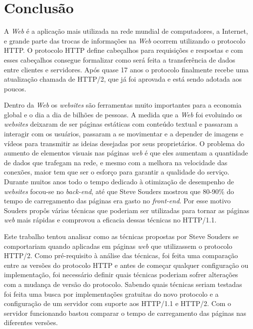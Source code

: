 %
%

\chapter{Conclusão}

A \textit{Web} é a aplicação mais utilizada na rede mundial de computadores, a Internet, e grande parte das trocas de informações na \textit{Web} ocorrem utilizando o protocolo HTTP. O protocolo HTTP define cabeçalhos para requisições e respostas e com esses cabeçalhos consegue formalizar como será feita a transferência de dados entre clientes e servidores. Após quase 17 anos o protocolo finalmente recebe uma atualização chamada de HTTP/2, que já foi aprovada e está sendo adotada aos poucos.

Dentro da \textit{Web} os \textit{websites} são ferramentas muito importantes para a economia global e o dia a dia de bilhões de pessoas. A medida que a \textit{Web} foi evoluindo os \textit{websites} deixaram de ser páginas estáticas com conteúdo textual e passaram a interagir com os usuários, passaram a se movimentar e a depender de imagens e vídeos para transmitir as ideias desejadas por seus proprietários. O problema do aumento de elementos visuais nas páginas \textit{web} é que eles aumentam a quantidade de dados que trafegam na rede, e mesmo com a melhora na velocidade das conexões, maior tem que ser o esforço para garantir a qualidade do serviço. Durante muitos anos todo o tempo dedicado à otimização de desempenho de \textit{websites} focou-se no \textit{back-end}, até que Steve Souders mostrou que 80-90\% do tempo de carregamento das páginas era gasto no \textit{front-end}. Por esse motivo Souders propôs várias técnicas que poderiam ser utilizadas para tornar as páginas \textit{web} mais rápidas e comprovou a eficacia dessas técnicas no HTTP/1.1.

Este trabalho tentou analisar como as técnicas propostas por Steve Souders se comportariam quando aplicadas em páginas \textit{web} que utilizassem o protocolo HTTP/2. Como pré-requisito à análise das técnicas, foi feita uma comparação entre as versões do protocolo HTTP e antes de começar qualquer configuração ou implementação, foi necessário definir quais técnicas poderiam sofrer alterações com a mudança de versão do protocolo. Sabendo quais técnicas seriam testadas foi feita uma busca por implementações gratuitas do novo protocolo e a configuração de um servidor com suporte aos HTTP/1.1 e HTTP/2. Com o servidor funcionando bastou comparar o tempo de carregamento das páginas nas diferentes versões.

